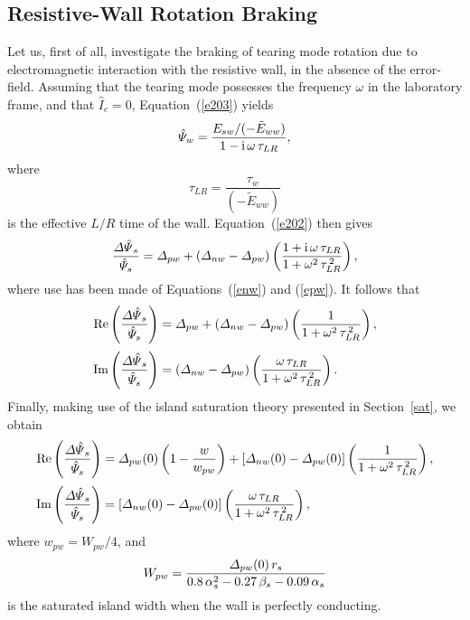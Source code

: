 \documentclass[notitlepage,12pt]{article}
\begin{document}
\subsection{Resistive-Wall Rotation Braking}\label{wall}
Let us, first of all, investigate the braking of tearing mode rotation due to electromagnetic interaction with the resistive wall, in the absence of the error-field. 
Assuming that the tearing mode possesses the frequency $\omega$ in the laboratory frame, and that $\hat{I}_c=0$, 
Equation~(\ref{e203}) yields
\begin{equation}
\hat{\mit\Psi}_w = \frac{E_{sw}/(-\tilde{E}_{ww})}{1-{\rm i}\,\omega\,\tau_{LR}},
\end{equation}
where
\begin{equation}
\tau_{LR} = \frac{\tau_w}{(-\tilde{E}_{ww})}
\end{equation}
is the effective $L/R$ time of the wall. Equation~(\ref{e202}) then gives
\begin{equation}
\frac{{\mit\Delta\hat{\Psi}}_s}{\hat{\mit\Psi}_s} = {\mit\Delta}_{pw} + ({\mit\Delta}_{nw}-{\mit\Delta}_{pw})\left(\frac{1+{\rm i}\,\omega\,\tau_{LR}}{1+\omega^2\,\tau_{LR}^{\,2}}\right),
\end{equation}
where use has been made of Equations~(\ref{enw}) and (\ref{epw}). It follows that
\begin{align}
{\rm Re}\left(\frac{{\mit\Delta\hat{\Psi}}_s}{\hat{\mit\Psi}_s}\right)&= {\mit\Delta}_{pw} + ({\mit\Delta}_{nw}-{\mit\Delta}_{pw})\left(\frac{1}{1+\omega^2\,\tau_{LR}^{\,2}}\right),\\[0.5ex]
{\rm Im}\left(\frac{{\mit\Delta\hat{\Psi}}_s}{\hat{\mit\Psi}_s}\right)&=({\mit\Delta}_{nw}-{\mit\Delta}_{pw})\left(\frac{\omega\,\tau_{LR}}{1+\omega^2\,\tau_{LR}^{\,2}}\right).
\end{align} 
Finally, making use of the island saturation theory presented in Section~\ref{sat}, we obtain
\begin{align}\label{e583}
{\rm Re}\left(\frac{{\mit\Delta\hat{\Psi}}_s}{\hat{\mit\Psi}_s}\right)&= {\mit\Delta}_{pw}(0)\left(1-\frac{w}{w_{pw}}\right) + [{\mit\Delta}_{nw}(0)-{\mit\Delta}_{pw}(0)]\left(\frac{1}{1+\omega^2\,\tau_{LR}^{\,2}}\right),\\[0.5ex]
{\rm Im}\left(\frac{{\mit\Delta\hat{\Psi}}_s}{\hat{\mit\Psi}_s}\right)&=[{\mit\Delta}_{nw}(0)-{\mit\Delta}_{pw}(0)]\left(\frac{\omega\,\tau_{LR}}{1+\omega^2\,\tau_{LR}^{\,2}}\right),\label{e584}
\end{align} 
where $w_{pw}=W_{pw}/4$, and
\begin{equation}
W_{pw} = \frac{{\mit\Delta}_{pw}(0)\,r_s}{0.8\,\alpha_s^2 -0.27\,\beta_s-0.09\,\alpha_s}
\end{equation}
is the saturated island width when the wall is perfectly conducting. 
\end{document}
